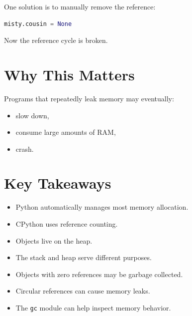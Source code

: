 \documentclass[11pt]{article}
\begin{document}
One solution is to manually remove the reference:

\begin{lstlisting}[language=Python]
misty.cousin = None
\end{lstlisting}

Now the reference cycle is broken.

\section{Why This Matters}

Programs that repeatedly leak memory may eventually:

\begin{itemize}
    \item slow down,
    \item consume large amounts of RAM,
    \item crash.
\end{itemize}

\section{Key Takeaways}

\begin{itemize}
    \item Python automatically manages most memory allocation.
    \item CPython uses reference counting.
    \item Objects live on the heap.
    \item The stack and heap serve different purposes.
    \item Objects with zero references may be garbage collected.
    \item Circular references can cause memory leaks.
    \item The \verb|gc| module can help inspect memory behavior.
\end{itemize}
\end{document}

